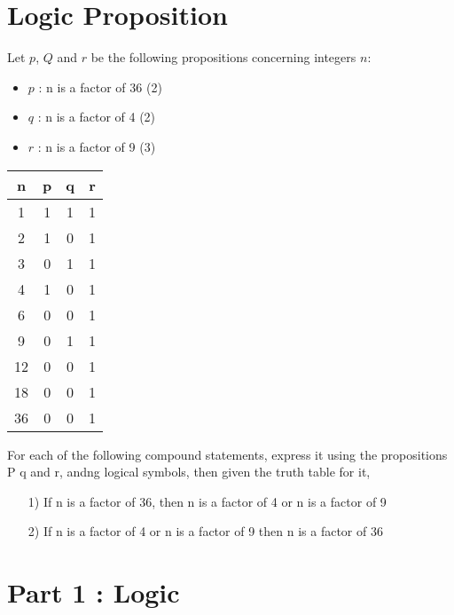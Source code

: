 \documentclass{article}
\begin{document}

\section{Logic Proposition}
Let $p$, $Q$ and $r$ be the following propositions concerning integers $n$:

\begin{itemize}
\item $p$ : n is a factor of 36 (2)
\item $q$ : n is a factor of 4 (2)
\item $r$ : n is a factor of 9 (3)
\end{itemize}


\begin{center}
\begin{tabular}{|c||c|c|c|}
\hline 
\phantom{spa} \textbf{n} \phantom{spa}	& \phantom{spa}	\textbf{p} \phantom{spa}	& \phantom{spa}	\textbf{q} \phantom{spa}	& \phantom{spa}	\textbf{r} \phantom{spa}	\\ \hline \hline
1	&	1	&	1	&	1	\\ \hline
2	&	1	&	0	&	1	\\ \hline
3	&	0	&	1	&	1	\\ \hline
4	&	1	&	0	&	1	\\ \hline
6	&	0	&	0	&	1	\\ \hline
9	&	0	&	1	&	1	\\ \hline
12	&	0	&	0	&	1	\\ \hline
18	&	0	&	0	&	1	\\ \hline
36	&	0	&	0	&	1	\\
\hline 
\end{tabular} 

For each of the following compound statements, express it using the propositions P q and r, andng logical symbols, then given the truth table for it,

\begin{itemize}
\item[1)] If n is a factor of 36, then n is a factor of 4 or n is a factor of 9
\item[2)] If n is a factor of 4 or n is a factor of 9 then  n is a factor of 36
\end{itemize}


\newpage

\section*{Part 1 : Logic}



\end{center}
\end{document}
